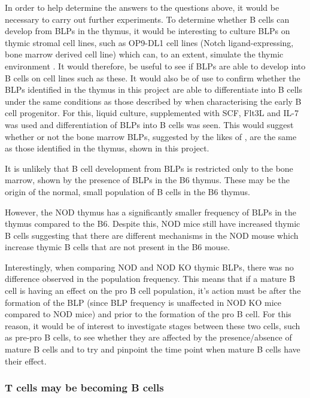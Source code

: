 In order to help determine the answers to the questions above, it would be necessary to carry out further experiments.
To determine whether B cells can develop from BLPs in the thymus, it would be interesting to culture BLPs on thymic stromal cell lines, such as OP9-DL1 cell lines (Notch ligand-expressing, bone marrow derived cell line) which can, to an extent, simulate the thymic environment \citep{Holmes2009}.
It would therefore, be useful to see if BLPs are able to develop into B cells on cell lines such as these.
It would also be of use to confirm whether the BLPs identified in the thymus in this project are able to differentiate into B cells under the same conditions as those described by \citet{Inlay2009} when characterising the early B cell progenitor.
For this, liquid culture, supplemented with SCF, Flt3L and IL-7 was used and differentiation of BLPs into B cells was seen.
This would suggest whether or not the bone marrow BLPs, suggested by the likes of \citet{Inlay2009}, are the same as those identified in the thymus, shown in this project.

It is unlikely that B cell development from BLPs is restricted only to the bone marrow, shown by the presence of BLPs in the B6 thymus.
These may be the origin of the normal, small population of B cells in the B6 thymus.

However, the NOD thymus has a significantly smaller frequency of BLPs in the thymus compared to the B6.
Despite this, NOD mice still have increased thymic B cells suggesting that there are different mechanisms in the NOD mouse which increase thymic B cells that are not present in the B6 mouse.

Interestingly, when comparing NOD and NOD KO thymic BLPs, there was no difference observed in the population frequency.
This means that if a mature B cell is having an effect on the pro B cell population, it's action must be after the formation of the BLP (since BLP frequency is unaffected in NOD KO mice compared to NOD mice) and prior to the formation of the pro B cell.
For this reason, it would be of interest to investigate stages between these two cells, such as pre-pro B cells, to see whether they are affected by the presence/absence of mature B cells and to try and pinpoint the time point when mature B cells have their effect.

\subsubsection{T cells may be becoming B cells}

